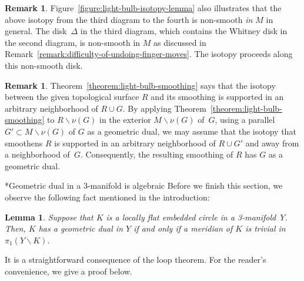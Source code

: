 \documentclass[11pt]{amsart}
\makeatletter
\def\subsubsection{\@startsection{subsubsection}{3}%
  \z@{.7\linespacing\@plus.2\linespacing}{-1.5ex}%
  {\normalfont\bfseries}}
\newtheorem{lemma}[theorem]{Lemma}
\theoremstyle{definition}
\newtheorem{remark}[theorem]{Remark}
\theoremstyle{theorem-giventitle}
\theoremstyle{definition-giventitle}
\numberwithin{equation}{section}
\def\setminus{\smallsetminus}
\makeatother
\begin{document}
\begin{remark}
  \label{remark:isotopy-non-smooth}
  Figure~\ref{figure:light-bulb-isotopy-lemma} also illustrates that the above isotopy from the third diagram to the fourth is non-smooth \emph{in $M$} in general.
  The disk~$\Delta$ in the third diagram, which contains the Whitney disk in the second diagram, is non-smooth in $M$ as discussed in Remark~\ref{remark:difficulty-of-undoing-finger-moves}.
  The isotopy proceeds along this non-smooth disk.
\end{remark}

\begin{remark}
  \label{remark:light-bulb-smoothing-restricted-support}
  Theorem~\ref{theorem:light-bulb-smoothing} says that the isotopy between the given topological surface $R$ and its smoothing is supported in an arbitrary neighborhood of $R\cup G$.
  By applying Theorem~\ref{theorem:light-bulb-smoothing} to $R\setminus \nu(G)$ in the exterior $M\setminus \nu(G)$ of~$G$, using a parallel $G'\subset M\setminus \nu(G)$ of $G$ as a geometric dual, we may assume that the isotopy that smoothens $R$ is supported in an arbitrary neighborhood of $R\cup G'$ and away from a neighborhood of~$G$.
  Consequently, the resulting smoothing of $R$ has $G$ as a geometric dual.
\end{remark}

\subsubsection*{Geometric dual in a 3-manifold is algebraic}
Before we finish this section, we observe the following fact mentioned in the introduction:

\begin{lemma}
  \label{lemma:dual-in-3-manifold}
  Suppose that $K$ is a locally flat embedded circle in a 3-manifold~$Y$.
  Then, $K$ has a geometric dual in $Y$ if and only if a meridian of $K$ is trivial in $\pi_1(Y \setminus K)$.
\end{lemma}

It is a straightforward consequence of the loop theorem. 
For the reader's convenience, we give a proof below.
\end{document}
